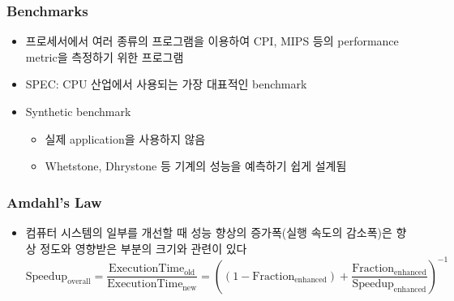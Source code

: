 \subsubsection*{Benchmarks}
\begin{itemize}
    \item 프로세서에서 여러 종류의 프로그램을 이용하여 CPI, MIPS 등의 performance metric을 측정하기 위한 프로그램
    \item SPEC: CPU 산업에서 사용되는 가장 대표적인 benchmark
    \item Synthetic benchmark
    \begin{itemize}
        \item 실제 application을 사용하지 않음
        \item Whetstone, Dhrystone 등 기계의 성능을 예측하기 쉽게 설계됨
    \end{itemize}
\end{itemize}

\subsubsection*{Amdahl's Law}
\begin{itemize}
    \item 컴퓨터 시스템의 일부를 개선할 때 성능 향상의 증가폭(실행 속도의 감소폭)은 향상 정도와 영향받은 부분의 크기와 관련이 있다
    \begin{equation}
        \text{Speedup}_\text{overall}=\frac{\text{ExecutionTime}_\text{old}}{\text{ExecutionTime}_\text{new}}=\left(\left(1-\text{Fraction}_\text{enhanced}\right)+\frac{\text{Fraction}_\text{enhanced}}{\text{Speedup}_\text{enhanced}}\right)^{-1}
    \end{equation}
\end{itemize}
